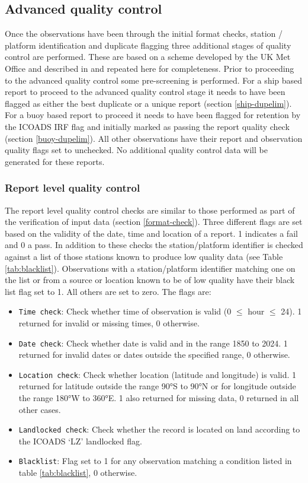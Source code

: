 \subsection{Advanced quality control}
Once the observations have been through the initial format checks, station / platform identification and duplicate flagging three additional stages of quality control are performed. 
These are based on a scheme developed by the UK Met Office and described in \cite{Kennedy2019} and repeated here for completeness.
Prior to proceeding to the advanced quality control some pre-screening is performed.
For a ship based report to proceed to the advanced quality control stage it needs to have been flagged as either the best duplicate or a unique report (section \ref{ship-dupelim}).
For a buoy based report to proceed it needs to have been flagged for retention by the ICOADS IRF flag and initially marked as passing the report quality check (section \ref{buoy-dupelim}).
All other observations have their report and observation quality flags set to unchecked. No additional quality control data will be generated for these reports.
\FloatBarrier
\subsubsection{Report level quality control} \label{report-qc}
The report level quality control checks are similar to those performed as part of the verification of input data (section \ref{format-check}).
Three different flags are set based on the validity of the date, time and location of a report. 1 indicates a fail and 0 a pass.
In addition to these checks the station/platform identifier is checked against a list of those stations known to produce low quality data (see Table \ref{tab:blacklist}). 
Observations with a station/platform identifier matching one on the list or from a source or location known to be of low quality have their black list flag set to 1. All others are set to zero.
The flags are:
\begin{itemize}
\item \texttt{Time check}: Check whether time of observation is valid (0 $\leq$ hour $\leq$ 24). 1 returned for invalid or missing times, 0 otherwise.
\item \texttt{Date check}: Check whether date is valid and in the range 1850 to 2024. 1 returned for invalid dates or dates outside the specified range, 0 otherwise.
\item \texttt{Location check}: Check whether location (latitude and longitude) is valid. 1 returned for latitude outside the range 90°S to 90°N or for longitude outside the range 180°W to 360°E. 1 also returned for missing data, 0 returned in all other cases.
\item \texttt{Landlocked check}: Check whether the record is located on land according to the ICOADS `LZ' landlocked flag.
\item \texttt{Blacklist}: Flag set to 1 for any observation matching a condition listed in table \ref{tab:blacklist}, 0 otherwise.
\end{itemize}

